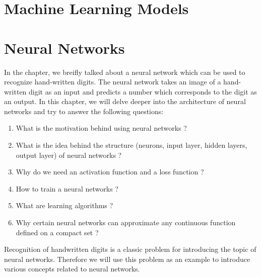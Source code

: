 \chapter{Machine Learning Models} %

\label{Chapter3} %
\setcounter{chapter}{3}

\chapter{Neural Networks}
In the  chapter, we breifly talked about a neural network which can be used 
to recognize hand-written digits. The neural network takes an image of a hand-written digit as 
an input and predicts a number which corresponds to the digit as an output. In this chapter, 
we will delve deeper into the architecture of neural networks and try to answer the following questions:
\begin{enumerate}
    \item What is the motivation behind using neural networks ?
    \item What is the idea behind the structure (neurons, input layer, hidden layers, output layer) 
    of neural networks ?
    \item Why do we need an activation function and a loss function ?
    \item How to train a neural networks ?
    \item What are learning algorithms ?
    \item Why certain neural networks can approximate any continuous function defined on a compact set ?
\end{enumerate}
Recognition of handwritten digits is a classic problem for introducing the topic of neural networks. Therefore 
we will use this problem as an example to introduce various concepts related to neural networks.
